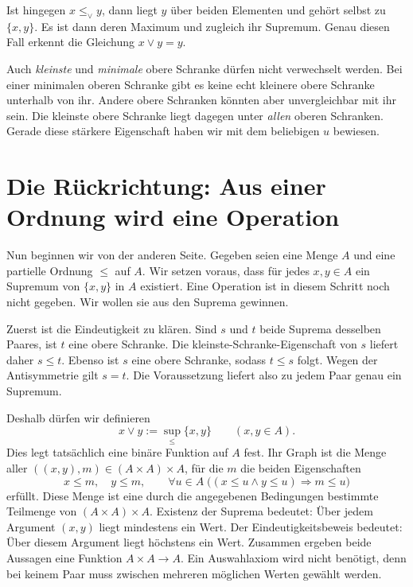 Ist hingegen \(x\leq_\vee y\), dann liegt \(y\) über
beiden Elementen und gehört selbst zu \(\{x,y\}\). Es ist
dann deren Maximum und zugleich ihr Supremum. Genau diesen Fall
erkennt die Gleichung \(x\vee y=y\).

Auch \emph{kleinste} und \emph{minimale} obere Schranke dürfen
nicht verwechselt werden. Bei einer minimalen oberen Schranke gibt
es keine echt kleinere obere Schranke unterhalb von ihr. Andere
obere Schranken könnten aber unvergleichbar mit ihr sein.
Die kleinste obere Schranke liegt dagegen unter \emph{allen}
oberen Schranken. Gerade diese stärkere Eigenschaft haben wir
mit dem beliebigen \(u\) bewiesen.

\par{}
\section*{Die Rückrichtung: Aus einer Ordnung wird eine Operation}
\hypertarget{semilattice.reading.reverse}{}

Nun beginnen wir von der anderen Seite. Gegeben seien eine Menge
\(A\) und eine partielle Ordnung \(\leq\) auf \(A\).
Wir setzen voraus, dass für jedes \(x,y\in A\) ein Supremum
von \(\{x,y\}\) in \(A\) existiert. Eine Operation ist in
diesem Schritt noch nicht gegeben. Wir wollen sie aus den Suprema
gewinnen.

Zuerst ist die Eindeutigkeit zu klären. Sind \(s\) und \(t\)
beide Suprema desselben Paares, ist \(t\) eine obere Schranke.
Die kleinste-Schranke-Eigenschaft von \(s\) liefert daher
\(s\leq t\). Ebenso ist \(s\) eine obere Schranke, sodass
\(t\leq s\) folgt. Wegen der Antisymmetrie gilt \(s=t\).
Die Voraussetzung liefert also zu jedem Paar genau ein Supremum.

Deshalb dürfen wir definieren
\begin{equation}
  x\vee y:=\sup_{\leq}\{x,y\}
  \qquad(x,y\in A).
  \tag{P}\label{semilattice-reading-pair-operation}
\end{equation}
Dies legt tatsächlich eine binäre Funktion auf \(A\) fest.
Ihr Graph ist die Menge aller \(((x,y),m)\in(A\times A)\times A\),
für die \(m\) die beiden Eigenschaften
\[
  x\leq m,\quad y\leq m,
  \qquad
  \forall u\in A\;
    \bigl((x\leq u\land y\leq u)\Longrightarrow m\leq u\bigr)
\]
erfüllt. Diese Menge ist eine durch die angegebenen Bedingungen
bestimmte Teilmenge von \((A\times A)\times A\).
Existenz der Suprema bedeutet: Über jedem Argument \((x,y)\)
liegt mindestens ein Wert. Der Eindeutigkeitsbeweis bedeutet:
Über diesem Argument liegt höchstens ein Wert. Zusammen ergeben
beide Aussagen eine Funktion \(A\times A\to A\).
Ein Auswahlaxiom wird nicht benötigt, denn bei keinem Paar muss
zwischen mehreren möglichen Werten gewählt werden.

